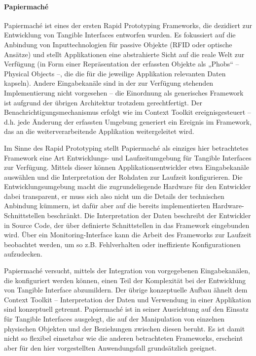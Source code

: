 
\paragraph{Papiermaché} %
\label{par:papiermaché}
Papiermaché \citep{Klemmer04} ist eines der ersten Rapid Prototyping Frameworks, die dezidiert zur Entwicklung von Tangible Interfaces entworfen wurden. Es fokussiert auf die Anbindung von Inputtechnologien für passive Objekte (RFID oder optische Ansätze) und stellt Applikationen eine abstrahierte Sicht auf die reale Welt zur Verfügung (in Form einer Repräsentation der erfassten Objekte als „Phobs“ -- Physical Objects --, die die für die jeweilige Applikation relevanten Daten kapseln). Andere Eingabekanäle sind in der zur Verfügung stehenden Implementierung nicht vorgesehen -- die Einordnung als generisches Framework ist aufgrund der übrigen Architektur trotzdem gerechtfertigt. Der Benachrichtigungsmechanismus erfolgt wie im Context Toolkit ereignisgesteuert -- d.h. jede Änderung der erfassten Umgebung generiert ein Ereignis im Framework, das an die weiterverarbeitende Applikation weitergeleitet wird.

Im Sinne des Rapid Prototyping stellt Papiermaché als einziges hier betrachtetes Framework eine Art Entwicklungs- und Laufzeitumgebung für Tangible Interfaces zur Verfügung. Mittels dieser können Applikationsentwickler etwa Eingabekanäle auswählen und die Interpretation der Rohdaten zur Laufzeit konfigurieren. Die Entwicklungsumgebung macht die zugrundeliegende Hardware für den Entwickler dabei transparent, er muss sich also nicht um die Details der technischen Anbindung kümmern, ist dafür aber auf die bereits implementierten Hardware-Schnittstellen beschränkt. Die Interpretation der Daten beschreibt der Entwickler in Source Code, der über definierte Schnittstellen in das Framework eingebunden wird. Über ein Monitoring-Interface kann die Arbeit des Frameworks zur Laufzeit beobachtet werden, um so z.B. Fehlverhalten oder ineffiziente Konfigurationen aufzudecken.

Papiermaché versucht, mittels der Integration von vorgegebenen Eingabekanälen, die konfiguriert werden können, einen Teil der Komplexität bei der Entwicklung von Tangible Interface abzumildern. Der übrige konzeptuelle Aufbau ähnelt dem Context Toolkit -- Interpretation der Daten und Verwendung in einer Applikation sind konzeptuell getrennt. Papiermaché ist in seiner Ausrichtung auf den Einsatz für Tangible Interfaces ausgelegt, die auf der Manipulation von einzelnen physischen Objekten und der Beziehungen zwischen diesen beruht. Es ist damit nicht so flexibel einsetzbar wie die anderen betrachteten Frameworks, erscheint aber für den hier vorgestellten Anwendungsfall grundsätzlich geeignet.

